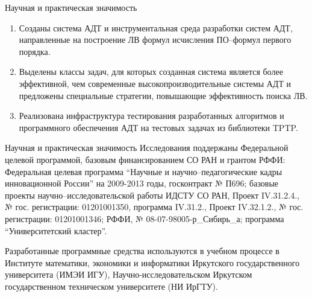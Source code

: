 \documentclass{beamer}
\begin{document}
\begin{frame}{Научная и практическая значимость}
\begin{enumerate}
\item Созданы система АДТ и инструментальная среда разработки систем АДТ, направленные на построение ЛВ формул исчисления ПО--формул первого порядка.
\item Выделены классы задач, для которых созданная система является более эффективной, чем современные высокопроизводительные системы АДТ и предложены специальные стратегии, повышающие эффективность поиска ЛВ.
\item Реализована инфраструктура тестирования разработанных алгоритмов и программного обеспечения АДТ на тестовых задачах из библиотеки TPTP.
\end{enumerate}
\end{frame}

\begin{frame}{Научная и практическая значимость}
Исследования поддержаны Федеральной целевой программой, базовым финансированием СО РАН и грантом РФФИ:
Федеральная целевая программа ``Научные и научно--педагогические кадры инновационной России'' на 2009-2013 годы, госконтракт № П696;
базовые проекты научно--исследовательской работы ИДСТУ СО РАН, Проект IV.31.2.4., № гос. регистрации: 01201001350, программа IV.31.2., Проект IV.32.1.2., № гос. регистрации: 01201001346;
РФФИ, № 08-07-98005-р\_Сибирь\_а;
программа ``Университетский кластер''.

Разработанные программные средства используются в учебном процессе в Институте математики, экономики и информатики Иркутского государственного университета (ИМЭИ ИГУ), Научно-исследовательском Иркутском государственном техническом университете (НИ ИрГТУ).
\end{frame}
\end{document}

